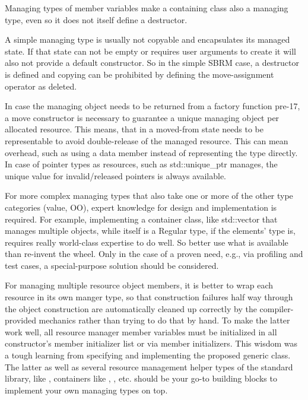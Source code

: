 \documentclass[ebook,11pt,article]{memoir}
\begin{document}
Managing types of member variables make a containing class also a managing type, even so it does not itself define a destructor.

A simple managing type is usually not copyable and encapsulates its managed state. If that state can not be empty or requires user arguments to create it will also not provide a default constructor. So in the simple SBRM case, a destructor is defined and copying can be prohibited by defining the move-assignment operator as deleted.

In case the managing object needs to be returned from a factory function pre-\Cpp{}17, a move constructor is necessary to guarantee a unique managing object per allocated resource. This means, that in a moved-from state needs to be representable to avoid double-release of the managed resource. This can mean overhead, such as using a  data member instead of representing the  type directly. In case of pointer types as resources, such as std::unique_ptr manages, the unique value for invalid/released pointers  is always available.

For more complex managing types that also take one or more of the other type categories (value, OO), expert knowledge for design and implementation is required. For example, implementing a container class, like std::vector that manages multiple objects, while itself is a Regular type, if the elements' type is, requires really world-class expertise to do well. So better use what is available than re-invent the wheel. Only in the case of a proven need, e.g., via profiling and test cases, a special-purpose solution should be considered.

For managing multiple resource object members, it is better to wrap each resource in its own manger type, so that construction failures half way through the object construction are automatically cleaned up correctly by the compiler-provided mechanics rather than trying to do that by hand. To make the latter work well, all resource manager member variables must be initialized in all constructor's member initializer list or via member initializers. This wisdom was a tough learning from specifying and implementing the proposed generic  class. The latter as well as several resource management helper types of the standard library, like , containers like , , etc. should be your go-to building blocks to implement your own managing types on top.
\end{document}
